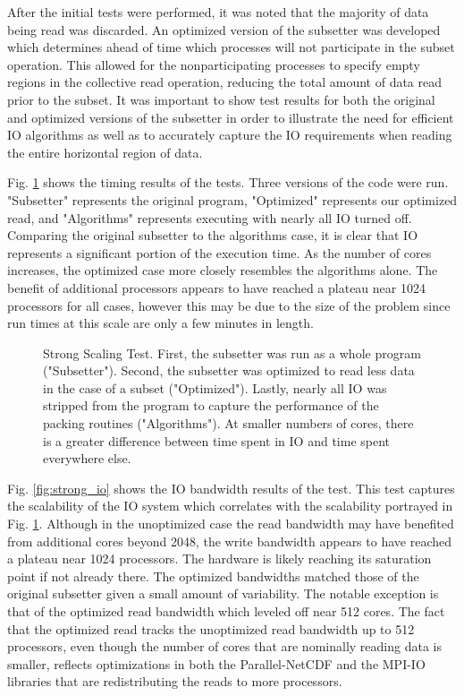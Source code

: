 After the initial tests were performed, it was noted that the majority of data
being read was discarded.  An optimized version of the subsetter was developed
which determines ahead of time which processes will not participate in the
subset operation.  This allowed for the nonparticipating processes to specify
empty regions in the collective read operation, reducing the total amount of
data read prior to the subset.  It was important to show test results for both
the original and optimized versions of the subsetter in order to illustrate
the need for efficient IO algorithms as well as to accurately capture the IO
requirements when reading the entire horizontal region of data.

Fig. \ref{fig:strong} shows the timing results of the tests.  Three versions
of the code were run.  "Subsetter" represents the original program,
"Optimized" represents our optimized read, and "Algorithms" represents
executing with nearly all IO turned off.  Comparing the original subsetter to
the algorithms case, it is clear that IO represents a significant portion of
the execution time.  As the number of cores increases, the optimized case more
closely resembles the algorithms alone.  The benefit of additional processors
appears to have reached a plateau near 1024 processors for all cases, however
this may be due to the size of the problem since run times at this scale are
only a few minutes in length.

\begin{figure}[!t]
\center
\resizebox{3.5in}{!}{

}
\caption{Strong Scaling Test.  First, the subsetter was run as a whole
program ("Subsetter").  Second, the subsetter was optimized to read less data
in the case of a subset ("Optimized").  Lastly, nearly all IO was stripped
from the program to capture the performance of the packing routines
("Algorithms").  At smaller numbers of cores, there is a greater difference
between time spent in IO and time spent everywhere else.}
\label{fig:strong}
\end{figure}

Fig. \ref{fig:strong_io} shows the IO bandwidth results of the test.  This
test captures the scalability of the IO system which correlates with the
scalability portrayed in Fig. \ref{fig:strong}.  Although in the unoptimized
case the read bandwidth may have benefited from additional cores beyond 2048,
the write bandwidth appears to have reached a plateau near 1024 processors.
The hardware is likely reaching its saturation point if not already there.
The optimized bandwidths matched those of the original subsetter given a small
amount of variability.  The notable exception is that of the optimized read
bandwidth which leveled off near 512 cores. The fact that the optimized read
tracks the unoptimized read bandwidth up to 512 processors, even though the
number of cores that are nominally reading data is smaller, reflects
optimizations in both the Parallel-NetCDF and the MPI-IO libraries that are
redistributing the reads to more processors.

